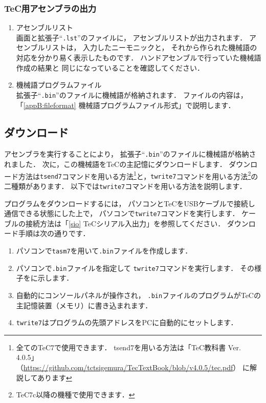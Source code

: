 \subsubsection{TeC用アセンブラの出力}

\begin{enumerate}
\item アセンブルリスト\\
画面と拡張子``{\tt .lst}''のファイルに，
アセンブルリストが出力されます．
アセンブルリストは，
入力したニーモニックと，
それから作られた機械語の対応を分かり易く表示したものです．
ハンドアセンブルで行っていた機械語作成の結果と
同じになっていることを確認してください．

\item 機械語プログラムファイル\\
拡張子``{\tt .bin}''のファイルに機械語が格納されます．
ファイルの内容は，
「\ref{appB:fileformat} 機械語プログラムファイル形式」で説明します．
\end{enumerate}

\subsection{ダウンロード}

アセンブラを実行することにより，
拡張子``{\tt .bin}''のファイルに機械語が格納されました．
次に，この機械語をTeCの主記憶にダウンロードします．
ダウンロード方法は{\tt tsend7}コマンドを用いる方法\footnote{
全てのTeC7で使用できます．
tsend7を用いる方法は「TeC教科書 Ver. 4.0.5」
（\url{https://github.com/tctsigemura/TecTextBook/blob/v4.0.5/tec.pdf}）
に解説してあります
}と，{\tt twrite7}コマンドを用いる方法\footnote{
TeC7c以降の機種で使用できます．
}の二種類があります．
以下では{\tt twrite7}コマンドを用いる方法を説明します．

プログラムをダウンロードするには，
パソコンとTeCをUSBケーブルで接続し通信できる状態にした上で，
パソコンで{\tt twrite7}コマンドを実行します．
ケーブルの接続方法は「\ref{sio} TeCシリアル入出力」を参照してください．
ダウンロード手順は次の通りです．

\begin{enumerate}
\item パソコンで{\tt tasm7}を用いて{\tt .bin}ファイルを作成します．
\item パソコンで{\tt .bin}ファイルを指定して
  {\tt twrite7}コマンドを実行します．
  その様子をに示します．
\item 自動的にコンソールパネルが操作され，
  {\tt .bin}ファイルのプログラムがTeCの主記憶装置（メモリ）に書き込まれます．
\item {\tt twrite7}はプログラムの先頭アドレスをPCに自動的にセットします．
\end{enumerate}


